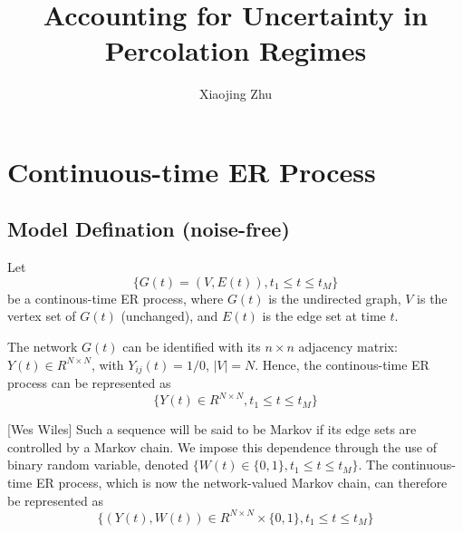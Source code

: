 \documentclass[10pt,letterpaper]{article}
\title{Accounting for Uncertainty in Percolation Regimes}
\author{Xiaojing Zhu}
\numberwithin{table}{section}
\numberwithin{figure}{section}
\numberwithin{equation}{section}
\begin{document}
\maketitle

\section{Continuous-time ER Process}
\subsection{Model Defination (noise-free)}
Let 
\begin{equation}
\{G(t)= (V, E(t)), t_1 \leq t\leq t_M\}
\end{equation}
be a continous-time ER process, where $G(t)$ is the undirected graph, $V$ is the vertex set of $G(t)$ (unchanged), and $E(t)$ is the edge set at time $t$. 

The network $G(t)$ can be identified with its $n \times n$ adjacency matrix: $Y(t) \in R^{N \times N}$, with $Y_{ij}(t) = 1/0$, $|V| = N$. Hence, the continous-time ER process can be represented as 
\begin{equation}
\{Y(t) \in R^{N \times N}, t_1 \leq t\leq t_M\}
\end{equation}

[Wes Wiles] Such a sequence will be said to be Markov if its edge sets are controlled by a Markov chain. We impose this dependence through the use of binary random variable, denoted $\{W(t) \in \{0,1\}, t_1\leq t \leq t_M\}$. The continuous-time ER process, which is now the network-valued Markov chain, can therefore be represented as 
\begin{equation}
\{(Y(t),W(t)) \in R^{N \times N} \times \{0,1\}, t_1 \leq t\leq t_M\}
\end{equation}
\end{document}
